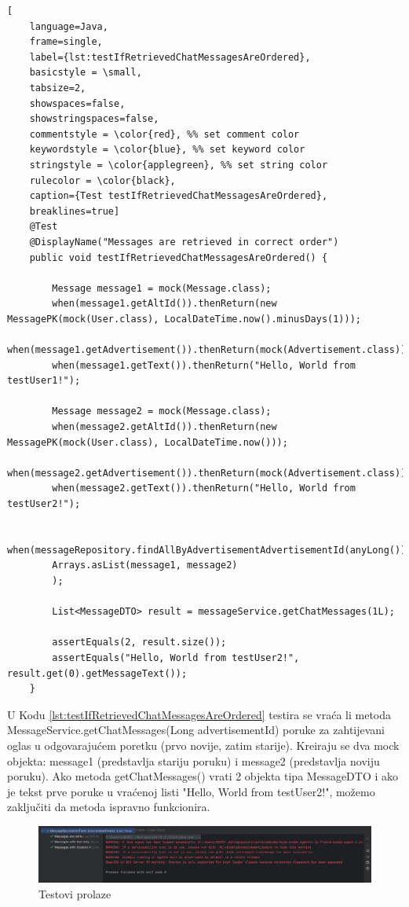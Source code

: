 \begin{lstlisting}[
	language=Java,
	frame=single,
	label={lst:testIfRetrievedChatMessagesAreOrdered},
	basicstyle = \small,
	tabsize=2,
	showspaces=false,
	showstringspaces=false,
	commentstyle = \color{red}, %% set comment color
	keywordstyle = \color{blue}, %% set keyword color
	stringstyle = \color{applegreen}, %% set string color
	rulecolor = \color{black},
	caption={Test testIfRetrievedChatMessagesAreOrdered},
	breaklines=true]
	@Test
	@DisplayName("Messages are retrieved in correct order")
	public void testIfRetrievedChatMessagesAreOrdered() {
		
		Message message1 = mock(Message.class);
		when(message1.getAltId()).thenReturn(new MessagePK(mock(User.class), LocalDateTime.now().minusDays(1)));
		when(message1.getAdvertisement()).thenReturn(mock(Advertisement.class));
		when(message1.getText()).thenReturn("Hello, World from testUser1!");
		
		Message message2 = mock(Message.class);
		when(message2.getAltId()).thenReturn(new MessagePK(mock(User.class), LocalDateTime.now()));
		when(message2.getAdvertisement()).thenReturn(mock(Advertisement.class));
		when(message2.getText()).thenReturn("Hello, World from testUser2!");
		
		when(messageRepository.findAllByAdvertisementAdvertisementId(anyLong())).thenReturn(
		Arrays.asList(message1, message2)
		);
		
		List<MessageDTO> result = messageService.getChatMessages(1L);
		
		assertEquals(2, result.size());
		assertEquals("Hello, World from testUser2!", result.get(0).getMessageText());
	}
\end{lstlisting}

U Kodu \ref{lst:testIfRetrievedChatMessagesAreOrdered} testira se vraća li metoda MessageService.getChatMessages(Long advertisementId) poruke za zahtijevani oglas u odgovarajućem poretku (prvo novije, zatim starije). Kreiraju se dva mock objekta: message1 (predstavlja stariju poruku) i message2 (predstavlja noviju poruku). Ako metoda getChatMessages() vrati 2 objekta tipa MessageDTO i ako je tekst prve poruke u vraćenoj listi "Hello, World from testUser2!", možemo zaključiti da metoda ispravno funkcionira.

\begin{figure}[!htb]
	\centering
	\includegraphics[width=\textwidth]{slike/test3.png}
	\caption{Testovi prolaze}
\end{figure}

